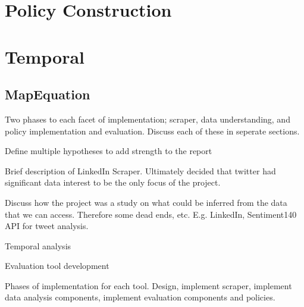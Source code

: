 \section{Policy Construction}

\section{Temporal}

\subsection{MapEquation}

Two phases to each facet of implementation; scraper, data understanding, and policy implementation and evaluation. Discuss each of these in seperate sections.

Define multiple hypotheses to add strength to the report

Brief description of LinkedIn Scraper. Ultimately decided that twitter had significant data interest to be the only focus of the project.

Discuss how the project was a study on what could be inferred from the data that we can access. Therefore some dead ends, etc. E.g. LinkedIn, Sentiment140 API for tweet analysis. 

Temporal analysis

Evaluation tool development

Phases of implementation for each tool. Design, implement scraper, implement data analysis components, implement evaluation components and policies. 